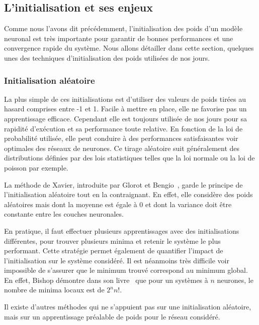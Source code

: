 \subsection{L'initialisation et ses enjeux}
Comme nous l'avons dit précédemment, l'initialisation des poids d'un modèle neuronal est très importante pour garantir de bonnes performances et une convergence rapide du système. Nous allons détailler dans cette section, quelques unes des techniques d'initialisation des poids utilisées de nos jours.


\subsubsection{Initialisation aléatoire}
La plus simple de ces initialisations est d’utiliser des valeurs de poids tirées au hasard comprises entre -1 et 1. Facile à mettre en place, elle ne favorise pas un apprentissage efficace. Cependant elle est toujours utilisée de nos jours pour sa rapidité d'exécution et sa performance toute relative. En fonction de la loi de probabilité utilisée, elle peut conduire à des performances satisfaisantes voir optimales des réseaux de neurones. Ce tirage aléatoire suit généralement des distributions définies par des lois statistiques telles que la loi normale ou la loi de poisson par exemple.

La méthode de Xavier, introduite par Glorot et Bengio~\cite{Glorot2010}, garde le principe de l'initialisation aléatoire tout en la contraignant. En effet, elle considère des poids aléatoires mais dont la moyenne est égale à $0$ et dont la variance doit être constante entre les couches neuronales.

En pratique, il faut effectuer plusieurs apprentissages avec des initialisations différentes, pour trouver plusieurs minima et retenir le système le plus performant. Cette stratégie permet également de quantifier l'impact de l'initialisation sur le système considéré. Il est néanmoins très difficile voir impossible de s'assurer que le minimum trouvé correspond au minimum global. En effet, Bishop démontre dans son livre~\cite{Bishop2006} que pour un systèmes à $n$ neurones, le nombre de minima locaux est de $2^n n!$.

Il existe d'autres méthodes qui ne s'appuient pas sur une initialisation aléatoire, mais sur un apprentissage préalable de poids pour le réseau considéré.


